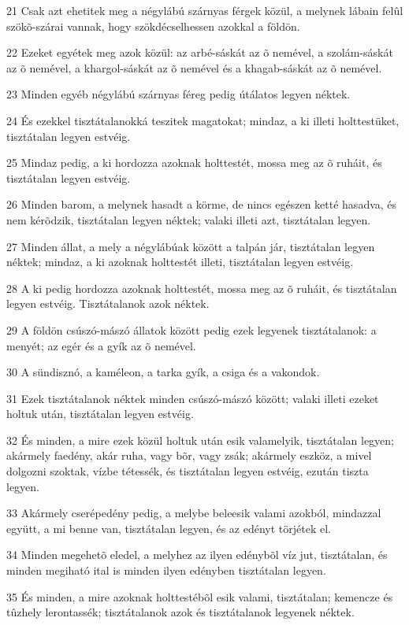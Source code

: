 \par 21 Csak azt ehetitek meg a négylábú szárnyas férgek közül, a melynek lábain felûl szökõ-szárai vannak, hogy szökdécselhessen azokkal a földön.
\par 22 Ezeket egyétek meg azok közül: az arbé-sáskát az õ nemével, a szolám-sáskát az õ nemével, a khargol-sáskát az õ nemével és a khagab-sáskát az õ nemével.
\par 23 Minden egyéb négylábú szárnyas féreg pedig útálatos legyen néktek.
\par 24 És ezekkel tisztátalanokká teszitek magatokat; mindaz, a ki illeti holttestüket, tisztátalan legyen estvéig.
\par 25 Mindaz pedig, a ki hordozza azoknak holttestét, mossa meg az õ ruháit, és tisztátalan legyen estvéig.
\par 26 Minden barom, a melynek hasadt a körme, de nincs egészen ketté hasadva, és nem kérõdzik, tisztátalan legyen néktek; valaki illeti azt, tisztátalan legyen.
\par 27 Minden állat, a mely a négylábúak között a talpán jár, tisztátalan legyen néktek; mindaz, a ki azoknak holttestét illeti, tisztátalan legyen estvéig.
\par 28 A ki pedig hordozza azoknak holttestét, mossa meg az õ ruháit, és tisztátalan legyen estvéig. Tisztátalanok azok néktek.
\par 29 A földön csúszó-mászó állatok között pedig ezek legyenek tisztátalanok: a menyét; az egér és a gyík az õ nemével.
\par 30 A sündisznó, a kaméleon, a tarka gyík, a csiga és a vakondok.
\par 31 Ezek tisztátalanok néktek minden csúszó-mászó között; valaki illeti ezeket holtuk után, tisztátalan legyen estvéig.
\par 32 És minden, a mire ezek közül holtuk után esik valamelyik, tisztátalan legyen; akármely faedény, akár ruha, vagy bõr, vagy zsák; akármely eszköz, a mivel dolgozni szoktak, vízbe tétessék, és tisztátalan legyen estvéig, ezután tiszta legyen.
\par 33 Akármely cserépedény pedig, a melybe beleesik valami azokból, mindazzal együtt, a mi benne van, tisztátalan legyen, és az edényt törjétek el.
\par 34 Minden megehetõ eledel, a melyhez az ilyen edénybõl víz jut, tisztátalan, és minden megiható ital is minden ilyen edényben tisztátalan legyen.
\par 35 És minden, a mire azoknak holttestébõl esik valami, tisztátalan; kemencze és tûzhely lerontassék; tisztátalanok azok és tisztátalanok legyenek néktek.
